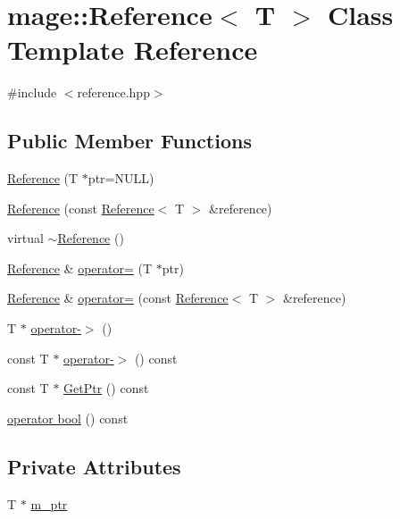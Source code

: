 \hypertarget{classmage_1_1_reference}{}\section{mage\+:\+:Reference$<$ T $>$ Class Template Reference}
\label{classmage_1_1_reference}


{\ttfamily \#include $<$reference.\+hpp$>$}

\subsection*{Public Member Functions}
\begin{DoxyCompactItemize}
\item 
\hyperlink{classmage_1_1_reference_a62039d823993670fdb8c3ddedcc794c7}{Reference} (T $\ast$ptr=N\+U\+LL)
\item 
\hyperlink{classmage_1_1_reference_abc471d0d652884353af99f7c668a467d}{Reference} (const \hyperlink{classmage_1_1_reference}{Reference}$<$ T $>$ \&reference)
\item 
virtual \hyperlink{classmage_1_1_reference_a88dd14871881ba478b5a86ce011775e7}{$\sim$\+Reference} ()
\item 
\hyperlink{classmage_1_1_reference}{Reference} \& \hyperlink{classmage_1_1_reference_abf1457f709eefcc56e23ad6f127cd9a4}{operator=} (T $\ast$ptr)
\item 
\hyperlink{classmage_1_1_reference}{Reference} \& \hyperlink{classmage_1_1_reference_a0e0fadab4a752fb78124380feeafb2a2}{operator=} (const \hyperlink{classmage_1_1_reference}{Reference}$<$ T $>$ \&reference)
\item 
T $\ast$ \hyperlink{classmage_1_1_reference_a70e8990c4f4d879692fc2cd28cb6dd88}{operator-\/$>$} ()
\item 
const T $\ast$ \hyperlink{classmage_1_1_reference_ab0f3ae3e1c9f71c211db4b1ec6dcca83}{operator-\/$>$} () const
\item 
const T $\ast$ \hyperlink{classmage_1_1_reference_a88ee2da25d2ce963e8015080565c9bd1}{Get\+Ptr} () const
\item 
\hyperlink{classmage_1_1_reference_ab662fe14ad3fa6a22ba5cc8d51354630}{operator bool} () const
\end{DoxyCompactItemize}
\subsection*{Private Attributes}
\begin{DoxyCompactItemize}
\item 
T $\ast$ \hyperlink{classmage_1_1_reference_aa3d84127867c389254b7257cd3ed0733}{m\+\_\+ptr}
\end{DoxyCompactItemize}


